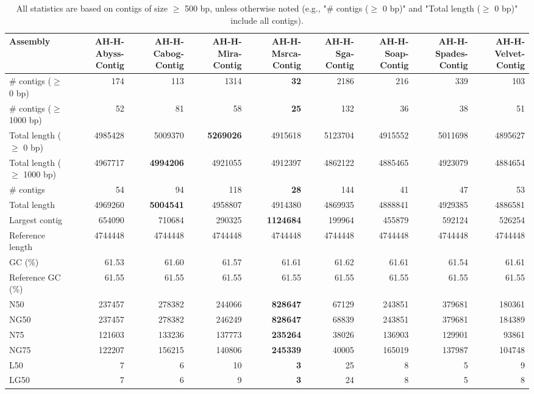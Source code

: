\documentclass[12pt,a4paper]{article}
\begin{document}
\begin{table}[ht]
\begin{center}
\caption{All statistics are based on contigs of size $\geq$ 500 bp, unless otherwise noted (e.g., "\# contigs ($\geq$ 0 bp)" and "Total length ($\geq$ 0 bp)" include all contigs).}
\begin{tabular}{|l*{8}{|r}|}
\hline
Assembly & AH-H-Abyss-Contig & AH-H-Cabog-Contig & AH-H-Mira-Contig & AH-H-Msrca-Contig & AH-H-Sga-Contig & AH-H-Soap-Contig & AH-H-Spades-Contig & AH-H-Velvet-Contig \\ \hline
\# contigs ($\geq$ 0 bp) & 174 & 113 & 1314 & {\bf 32} & 2186 & 216 & 339 & 103 \\ \hline
\# contigs ($\geq$ 1000 bp) & 52 & 81 & 58 & {\bf 25} & 132 & 36 & 38 & 51 \\ \hline
Total length ($\geq$ 0 bp) & 4985428 & 5009370 & {\bf 5269026} & 4915618 & 5123704 & 4915552 & 5011698 & 4895627 \\ \hline
Total length ($\geq$ 1000 bp) & 4967717 & {\bf 4994206} & 4921055 & 4912397 & 4862122 & 4885465 & 4923079 & 4884654 \\ \hline
\# contigs & 54 & 94 & 118 & {\bf 28} & 144 & 41 & 47 & 53 \\ \hline
Total length & 4969260 & {\bf 5004541} & 4958807 & 4914380 & 4869935 & 4888841 & 4929385 & 4886581 \\ \hline
Largest contig & 654090 & 710684 & 290325 & {\bf 1124684} & 199964 & 455879 & 592124 & 526254 \\ \hline
Reference length & 4744448 & 4744448 & 4744448 & 4744448 & 4744448 & 4744448 & 4744448 & 4744448 \\ \hline
GC (\%) & 61.53 & 61.60 & 61.57 & 61.61 & 61.62 & 61.61 & 61.54 & 61.61 \\ \hline
Reference GC (\%) & 61.55 & 61.55 & 61.55 & 61.55 & 61.55 & 61.55 & 61.55 & 61.55 \\ \hline
N50 & 237457 & 278382 & 244066 & {\bf 828647} & 67129 & 243851 & 379681 & 180361 \\ \hline
NG50 & 237457 & 278382 & 246249 & {\bf 828647} & 68839 & 243851 & 379681 & 184389 \\ \hline
N75 & 121603 & 133236 & 137773 & {\bf 235264} & 38026 & 136903 & 129901 & 93861 \\ \hline
NG75 & 122207 & 156215 & 140806 & {\bf 245339} & 40005 & 165019 & 137987 & 104748 \\ \hline
L50 & 7 & 6 & 10 & {\bf 3} & 25 & 8 & 5 & 9 \\ \hline
LG50 & 7 & 6 & 9 & {\bf 3} & 24 & 8 & 5 & 8 \\ \hline

\end{tabular}
\end{center}
\end{table}
\end{document}
